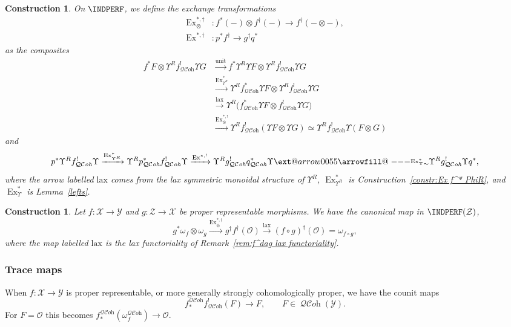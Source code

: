 \documentclass[12pt, oneside]{amsart}
\makeatletter
\newcommand*{\relbarfill@}{\arrowfill@\relbar\relbar\relbar}
\newcommand*{\xsimeq}[1]{\ext@arrow 0055{\relbarfill@}{\smash{\raisebox{1pt}{$\scriptstyle#1$}}\vphantom{#1}}{\substack{\vphantom{#1}\\ \raisebox{0.7ex}{$\scriptstyle\sim$}}}}
\numberwithin{equation}{section}
\newtheorem{construction}[subsubsection]{Construction}
\theoremstyle{remark}
\theoremstyle{plain}
\DeclareMathOperator{\QCOH}{\mathcal{QC}\textit{oh}}
\newcommand{\OO}{\mathcal{O}}
\newcommand{\YY}{\mathcal{Y}}
\newcommand{\ZZ}{\mathcal{Z}}
\newcommand{\XX}{\mathcal{X}}
\newcommand{\Ren}{\Upsilon}
\makeatother
\begin{document}
\begin{construction}\label{constr:Ex f^* f^dag}
On $\INDPERF$, we define the exchange transformations
\begin{align*}
  \operatorname{Ex}^{*,\dag}_\otimes &: f^*(-) \otimes f^\dag(-) \to f^\dag(- \otimes -),\\
  \operatorname{Ex}^{*,\dag} &: p^*f^\dag \to g^\dag q^*
\end{align*}
as the composites
\begin{align*}
  f^*F \otimes \Ren^R f^!_{\QCOH}\Ren G
  &\xrightarrow{\mathrm{unit}} f^*\Ren^R\Ren F \otimes \Ren^R f^!_{\QCOH}\Ren G\\
  &\xrightarrow{\operatorname{Ex}^*_{\Ren^R}} \Ren^R f^*_{\QCOH}\Ren F \otimes \Ren^R f^!_{\QCOH}\Ren G\\
  &\xrightarrow{\mathrm{lax}} \Ren^R\big(f^*_{\QCOH}\Ren F \otimes f^!_{\QCOH}\Ren G\big)\\
  &\xrightarrow{\operatorname{Ex}^{*,!}_\otimes} \Ren^R f^!_{\QCOH}(\Ren F \otimes \Ren G)
  \simeq \Ren^R f^!_{\QCOH}\Ren(F \otimes G)
\end{align*}
and
\[
  p^*\Ren^R f^!_{\QCOH}\Ren
  \xrightarrow{\operatorname{Ex}^*_{\Ren^R}} \Ren^R p^*_{\QCOH} f^!_{\QCOH}\Ren
  \xrightarrow{\operatorname{Ex}^{*,!}} \Ren^R g^!_{\QCOH} q^*_{\QCOH}\Ren
  \xsimeq{\operatorname{Ex}^*_\Ren} \Ren^R g^!_{\QCOH}\Ren q^*,
\]
where the arrow labelled $\mathrm{lax}$ comes from the lax symmetric monoidal structure of $\Ren^R$, $\operatorname{Ex}^*_{\Ren^R}$ is Construction~\ref{constr:Ex f^* PhiR}, and $\operatorname{Ex}^*_\Ren$ is Lemma~\ref{lefts}.
\end{construction}

\begin{construction}\label{constr:omega composite indperf}
Let $f : \XX \to \YY$ and $g : \ZZ \to \XX$ be proper representable morphisms.
We have the canonical map in $\INDPERF(\ZZ)$,
\[
  g^*\omega_f \otimes \omega_g
  \xrightarrow{\operatorname{Ex}^{*,\dag}_\otimes} g^\dag f^\dag(\OO)
  \xrightarrow{\mathrm{lax}} (f\circ g)^\dag(\OO) = \omega_{f\circ g},
\]
where the map labelled $\mathrm{lax}$ is the lax functoriality of Remark~\ref{rem:f^dag lax functoriality}.
\end{construction}

\subsubsection{Trace maps}\label{sssec:trace indperf}

When $f: \XX \to \YY$ is proper representable, or more generally strongly cohomologically proper, we have the counit maps
\[
  f_*^{\QCOH} f^!_{\QCOH}(F) \longrightarrow F,
  \qquad F \in \QCOH(\YY).
\]
For $F = \OO$ this becomes $f_*^{\QCOH} (\omega_f^{\QCOH}) \longrightarrow \OO$.
\end{document}
